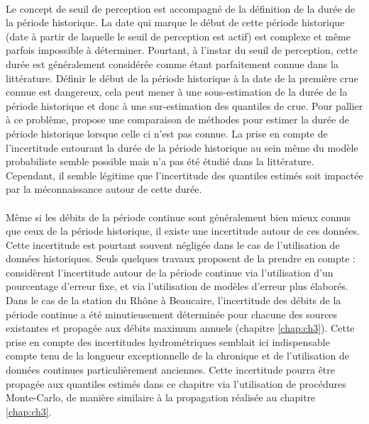	\paragraph{} Le concept de seuil de perception est accompagné de la définition de la durée de la période historique. La date qui marque le début de cette période historique (date à partir de laquelle le seuil de perception est actif) est complexe et même parfois impossible à déterminer. Pourtant, à l'instar du seuil de perception, cette durée est généralement considérée comme étant parfaitement connue dans la littérature. Définir le début de la période historique à la date de la première crue connue est dangereux, cela peut mener à une sous-estimation de la durée de la période historique et donc à une sur-estimation des quantiles de crue. Pour pallier à ce problème, \citet{prosdocimi_german_2018} propose une comparaison de méthodes pour estimer la durée de période historique lorsque celle ci n'est pas connue. La prise en compte de l'incertitude entourant la durée de la période historique au sein même du modèle probabiliste semble possible mais n'a pas été étudié dans la littérature. Cependant, il semble légitime que l'incertitude des quantiles estimés soit impactée par la méconnaissance autour de cette durée. 
	
	\paragraph{} Même si les débits de la période continue sont généralement bien mieux connus que ceux de la période historique, il existe une incertitude autour de ces données. Cette incertitude est pourtant souvent négligée dans le cas de l'utilisation de données historiques. Seuls quelques travaux proposent de la prendre en compte : \citet{parkes_defining_2016} considèrent l'incertitude autour de la période continue via l'utilisation d'un pourcentage d'erreur fixe, et \citet{neppel_flood_2010} via l'utilisation de modèles d'erreur plus élaborés. Dans le cas de la station du Rhône à Beaucaire, l'incertitude des débits de la période continue a été minutieusement déterminée pour chacune des sources existantes et propagée aux débits maximum annuels (chapitre \ref{chap:ch3}). Cette prise en compte des incertitudes hydrométriques semblait ici indispensable compte tenu de la longueur exceptionnelle de la chronique et de l'utilisation de données continues particulièrement anciennes. Cette incertitude pourra être propagée aux quantiles estimés dans ce chapitre via l'utilisation de procédures Monte-Carlo, de manière similaire à la propagation réalisée au chapitre \ref{chap:ch3}.
	
